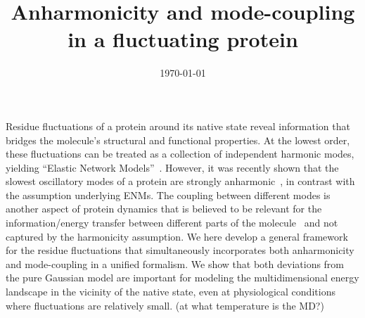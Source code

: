 \documentclass[prl,nofootinbib,twocolumn,floatfix,showpacs]{revtex4}
\begin{document}
\title{Anharmonicity and mode-coupling in a fluctuating protein}

\author{}

\date{\today }

\begin{abstract}
\end{abstract}

\pacs{}

\maketitle

Residue fluctuations of a protein around its native state reveal
information that bridges the molecule's structural and functional
properties.  At the lowest order, these fluctuations can be treated as
a collection of independent harmonic modes, yielding ``Elastic Network
Models''~\cite{ENM}. However, it was recently shown that the slowest
oscillatory modes of a protein are strongly
anharmonic~\cite{Yogurtcu}, in contrast with the assumption underlying
ENMs. The coupling between different modes is another aspect of
protein dynamics that is believed to be relevant for the
information/energy transfer between different parts of the
molecule~\cite{mode_coupling_ref} and not captured by the harmonicity
assumption. We here develop a general framework for the residue
fluctuations that simultaneously incorporates both anharmonicity and
mode-coupling in a unified formalism. We show that both deviations
from the pure Gaussian model are important for modeling the
multidimensional energy landscape in the vicinity of the native state,
even at physiological conditions where fluctuations are relatively
small. (at what temperature is the MD?)
\end{document}
